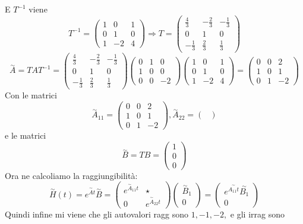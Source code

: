 \documentclass{article}
\begin{document}
E $T^{-1}$ viene \[ T^{-1} = \left(\begin{matrix}1 & 0 & 1\\0 & 1 & 0\\1 & -2 & 4\end{matrix}\right) \Longrightarrow T = \left(\begin{matrix}\frac{4}{3} & - \frac{2}{3} & - \frac{1}{3}\\0 & 1 & 0\\- \frac{1}{3} & \frac{2}{3} & \frac{1}{3}\end{matrix}\right) \]
\[ \overset{\sim}{A} = T A  T^{-1} = \left(\begin{matrix}\frac{4}{3} & - \frac{2}{3} & - \frac{1}{3}\\0 & 1 & 0\\- \frac{1}{3} & \frac{2}{3} & \frac{1}{3}\end{matrix}\right)\left(\begin{matrix}0 & 1 & 0\\1 & 0 & 0\\0 & 0 & -2\end{matrix}\right)\left(\begin{matrix}1 & 0 & 1\\0 & 1 & 0\\1 & -2 & 4\end{matrix}\right) = \left(\begin{matrix}0 & 0 & 2\\1 & 0 & 1\\0 & 1 & -2\end{matrix}\right) \]Con le matrici \[ \overset{\sim}{A}_{11} = \left(\begin{matrix}0 & 0 & 2\\1 & 0 & 1\\0 & 1 & -2\end{matrix}\right) , \overset{\sim}{A}_{22} = \left(\begin{matrix}\end{matrix}\right)  \]e le matrici \[ \overset{\sim}{B} = TB = \left(\begin{matrix}1\\0\\0\end{matrix}\right)  \]
Ora ne calcoliamo la raggiungibilità: \[ \overset{\sim}{H}(t) = e^{\overset{\sim}{A}t}\overset{\sim}{B} = \begin{pmatrix} e^{\overset{\sim}{A}_{11}t} &  \star \\ 0 & e^{\overset{\sim}{A}_{22}t} \end{pmatrix} \begin{pmatrix} \overset{\sim}{B}_1 \\ 0 \end{pmatrix} = \begin{pmatrix} e^{\overset{\sim}{A_{11}t}}\overset{\sim}{B_1} \\ 0 \end{pmatrix} \]
Quindi infine mi viene che gli autovalori ragg sono $ 1, -1, -2,  $ e gli irrag sono $  $
\end{document}
